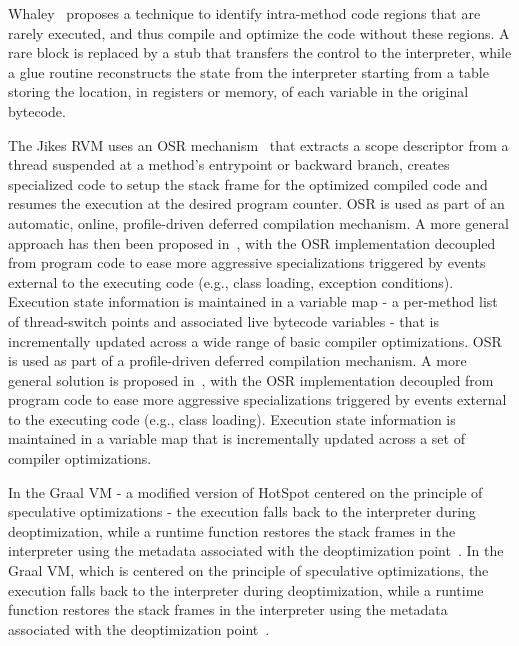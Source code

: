 \ifdefined \fullver
Whaley~\cite{whaley2001osr} proposes a technique to identify intra-method code regions that are rarely executed, and thus compile and optimize the code without these regions. A rare block is replaced by a stub that transfers the control to the interpreter, while a glue routine reconstructs the state from the interpreter starting from a table storing the location, in registers or memory, of each variable in the original bytecode.
\fi

The Jikes RVM uses an OSR mechanism~\cite{fink2003design} that extracts a scope descriptor from a thread suspended at a method's entrypoint or backward branch, creates specialized code to setup the stack frame for the optimized compiled code and resumes the execution at the desired program counter. 
\ifdefined \fullver
OSR is used as part of an automatic, online, profile-driven deferred compilation mechanism.
A more general approach has then been proposed in~\cite{soman2006efficient}, with the OSR implementation decoupled from program code to ease more aggressive specializations triggered by events external to the executing code (e.g., class loading, exception conditions). Execution state information is maintained in a variable map - a per-method list of thread-switch points and associated live bytecode variables - that is incrementally updated across a wide range of basic compiler optimizations.
\else
OSR is used as part of a profile-driven deferred compilation mechanism.
A more general solution is proposed in~\cite{soman2006efficient}, with the OSR implementation decoupled from program code to ease more aggressive specializations triggered by events external to the executing code (e.g., class loading). Execution state information is maintained in a variable map that is incrementally updated across a set of compiler optimizations.
\fi

\ifdefined \fullver
In the Graal VM - a modified version of HotSpot centered on the principle of speculative optimizations - the execution falls back to the interpreter during deoptimization, while a runtime function restores the stack frames in the interpreter using the metadata associated with the deoptimization point~\cite{duboscq2013graal,wurthinger2013truffle,duboscq2014metadata}.
\else
In the Graal VM, which is centered on the principle of speculative optimizations, the execution falls back to the interpreter during deoptimization, while a runtime function restores the stack frames in the interpreter using the metadata associated with the deoptimization point~\cite{duboscq2013graal,wurthinger2013truffle,duboscq2014metadata}.
\fi

